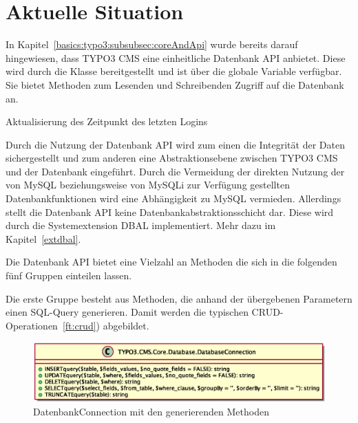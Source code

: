 \section{Aktuelle Situation}
\label{sec:currentSituation}
In Kapitel~\ref{basics:typo3:subsubsec:coreAndApi} wurde bereits darauf hingewiesen, dass TYPO3 CMS eine einheitliche Datenbank API anbietet. Diese wird durch die Klasse  bereitgestellt und ist über die globale Variable  verfügbar. Sie bietet Methoden zum Lesenden und Schreibenden Zugriff auf die Datenbank an.

\begin{listing}
	\caption{Aktualisierung des Zeitpunkt des letzten Logins}
	\label{lst:databaseOldExample}
\end{listing}

Durch die Nutzung der Datenbank API wird zum einen die Integrität der Daten sichergestellt und zum anderen eine Abstraktionsebene zwischen TYPO3 CMS und der Datenbank eingeführt. Durch die Vermeidung der direkten Nutzung der von MySQL beziehungsweise von MySQLi zur Verfügung gestellten Datenbankfunktionen wird eine Abhängigkeit zu MySQL vermieden. Allerdings stellt die Datenbank API keine Datenbankabstraktionsschicht dar. Diese wird durch die Systemextension DBAL implementiert. Mehr dazu im Kapitel~\ref{extdbal}.

Die Datenbank API bietet eine Vielzahl an Methoden die sich in die folgenden fünf Gruppen einteilen lassen.

Die erste Gruppe besteht aus Methoden, die anhand der übergebenen Parametern einen SQL-Query generieren. Damit werden die typischen CRUD-Operationen~\ref{ft:crud}) abgebildet.

\begin{figure}[H]
	\centering
	\includegraphics[scale=0.65]{gfx/uml/DatabaseConnectionCreationMethods.eps}
	\caption{DatenbankConnection mit den generierenden Methoden}
	\label{fig:databaseConnectionWithSQLGenerationMethods}
\end{figure}

